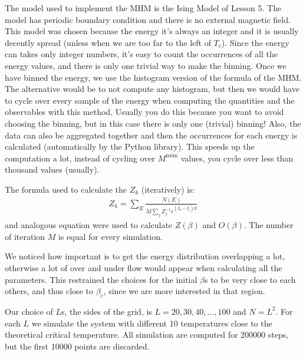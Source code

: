 \documentclass[../main.tex]{subfiles}
\begin{document}
The model used to implement the MHM is the Ising Model of Lesson 5. The model has periodic boundary condition and there is no external magnetic field. This model was chosen because the energy it's always an integer and it is usually decently spread (unless when we are too far to the left of $T_c$). Since the energy can takes only integer numbers, it's easy to count the occurrences of all the energy values, and there is only one trivial way to make the binning. Once we have binned the energy, we use the histogram version of the formula of the MHM. The alternative would be to not compute any histogram, but then we would have to cycle over every sample of the energy when computing the quantities and the observables with this method. Usually you do this because you want to avoid choosing the binning, but in this case there is only one (trivial) binning! Also, the data can also be aggregated together and then the occurrences for each energy is calculated (automatically by the Python library). This speeds up the computation a lot, instead of cycling over $M^{\text{nsim}}$ values, you cycle over less than thousand values (usually).

The formula used to calculate the $Z_k$ (iteratively) is:
\begin{align}
    Z_{k}=\sum_{E} \frac{ N(E)}{M\sum_{j} Z_{j}^{-1} e^{\left(\beta_{k}-\beta_{j}\right) E}}
\end{align} and analogous equation were used to calculate $Z(\beta)$ and $O(\beta)$. The number of iteration $M$ is equal for every simulation.

We noticed how important is to get the energy distribution overlapping a lot, otherwise a lot of over and under flow would appear when calculating all the parameters. This restrained the choices for the initial $\beta$s to be very close to each others, and thus close to $\beta_{c}$, since we are more interested in that region.

Our choice of $L$s, the sides of the grid, is $L=20, 30, 40, ..., 100$ and $N=L^2$. For each $L$ we  simulate the system with different 10 temperatures close to the theoretical critical temperature. All simulation are computed for 200000 steps, but the first 10000 points are discarded.
\end{document}
